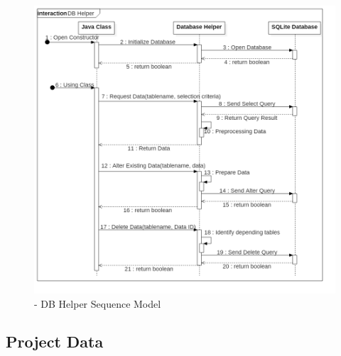 \begin{figure}[h] 
	\centering 
	\includegraphics[width=14cm]{images/DBHelper.png} 
	\caption{- DB Helper Sequence Model} 
	\label{fig:sequenceDBHelper}
\end{figure}
\subsection{Project Data}

